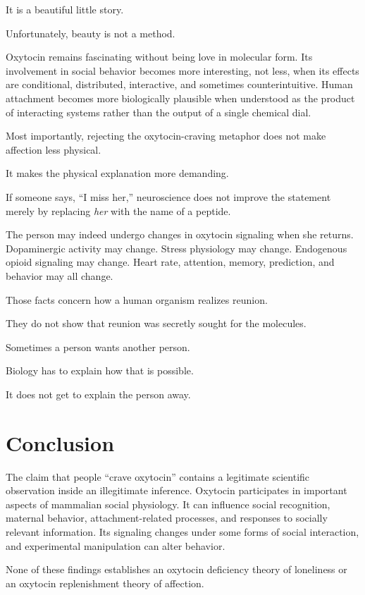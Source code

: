\documentclass[12pt]{article}
\begin{document}
It is a beautiful little story.

Unfortunately, beauty is not a method.

Oxytocin remains fascinating without being love in molecular form. Its involvement in social behavior becomes more interesting, not less, when its effects are conditional, distributed, interactive, and sometimes counterintuitive. Human attachment becomes more biologically plausible when understood as the product of interacting systems rather than the output of a single chemical dial.

Most importantly, rejecting the oxytocin-craving metaphor does not make affection less physical.

It makes the physical explanation more demanding.

If someone says, ``I miss her,'' neuroscience does not improve the statement merely by replacing \emph{her} with the name of a peptide.

The person may indeed undergo changes in oxytocin signaling when she returns. Dopaminergic activity may change. Stress physiology may change. Endogenous opioid signaling may change. Heart rate, attention, memory, prediction, and behavior may all change.

Those facts concern how a human organism realizes reunion.

They do not show that reunion was secretly sought for the molecules.

Sometimes a person wants another person.

Biology has to explain how that is possible.

It does not get to explain the person away.

\section*{Conclusion}

The claim that people ``crave oxytocin'' contains a legitimate scientific observation inside an illegitimate inference. Oxytocin participates in important aspects of mammalian social physiology. It can influence social recognition, maternal behavior, attachment-related processes, and responses to socially relevant information. Its signaling changes under some forms of social interaction, and experimental manipulation can alter behavior.

None of these findings establishes an oxytocin deficiency theory of loneliness or an oxytocin replenishment theory of affection.
\end{document}

